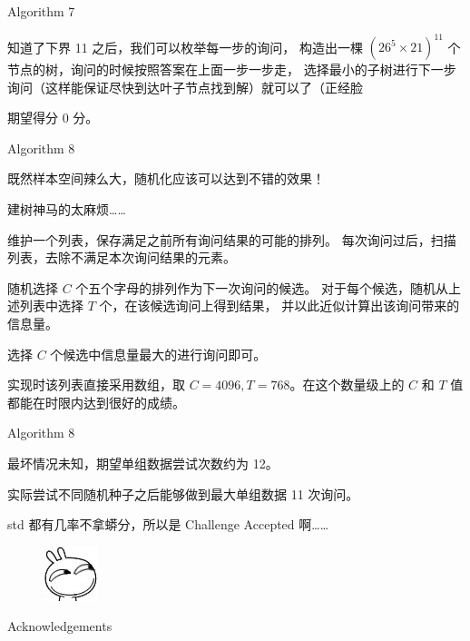 \documentclass[UTF8]{beamer}
\begin{document}
\begin{frame}{Algorithm 7}

知道了下界 11 之后，我们可以枚举每一步的询问，%
构造出一棵 $(26^5 \times 21)^{11}$ 个节点的树，询问的时候按照答案在上面一步一步走，%
选择最小的子树进行下一步询问（这样能保证尽快到达叶子节点找到解）就可以了（正经脸 \newline\newline

\pause 期望得分 0 分。

\end{frame}

\begin{frame}{Algorithm 8}

既然样本空间辣么大，随机化应该可以达到不错的效果！

\pause
建树神马的太麻烦……

维护一个列表，保存满足之前所有询问结果的可能的排列。%
每次询问过后，扫描列表，去除不满足本次询问结果的元素。

\pause
随机选择 $C$ 个五个字母的排列作为下一次询问的候选。%
对于每个候选，随机从上述列表中选择 $T$ 个，在该候选询问上得到结果，%
并以此近似计算出该询问带来的信息量。

选择 $C$ 个候选中信息量最大的进行询问即可。

\pause
实现时该列表直接采用数组，取 $C = 4096, T = 768$。在这个数量级上的 %
$C$ 和 $T$ 值都能在时限内达到很好的成绩。

\end{frame}

\begin{frame}{Algorithm 8}

最坏情况未知，期望单组数据尝试次数约为 12。

实际尝试不同随机种子之后能够做到最大单组数据 11 次询问。

\pause
std 都有几率不拿蟒分，所以是 Challenge Accepted 啊……

\begin{figure}[h]\centering
\includegraphics[scale=0.5]{zz.jpg}
\end{figure}

\end{frame}

\begin{frame}{Acknowledgements}

\end{frame}
\end{document}

